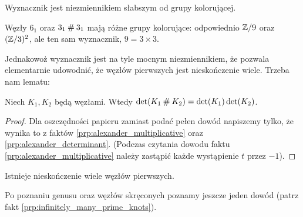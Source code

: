 Wyznacznik jest niezmiennikiem słabszym  od grupy kolorującej.

\begin{example}
    Węzły $6_1$ oraz $3_1 \mathbin{\#} 3_1$ mają różne grupy kolorujące: odpowiednio $\mathbb Z/9$ oraz ~$(\mathbb Z/3)^2$, ale ten sam wyznacznik, $9 = 3 \times 3$.
\end{example}

Jednakowoż wyznacznik jest na tyle mocnym niezmiennikiem, że pozwala elementarnie udowodnić, że węzłów pierwszych jest nieskończenie wiele.
Trzeba nam lematu:

\begin{lemma}
\label{lem:det_multiplicativ}%
    Niech $K_1, K_2$ będą węzłami.
    Wtedy $\det(K_1 \mathbin{\#} K_2) = \det(K_1) \det(K_2)$.
\end{lemma}

\begin{proof}
    Dla oszczędności papieru zamiast podać pełen dowód napiszemy tylko, że wynika to z faktów \ref{prp:alexander_multiplicative} oraz \ref{prp:alexander_determinant}.
    (Podczas czytania dowodu faktu \ref{prp:alexander_multiplicative} należy zastąpić każde wystąpienie $t$ przez $-1$).
\end{proof}

\begin{proposition}
\label{prop:infinite_prime_knots_1}%
    Istnieje nieskończenie wiele węzłów pierwszych.
\end{proposition}

Po poznaniu genusu oraz węzłów skręconych poznamy jeszcze jeden dowód (patrz fakt \ref{prp:infinitely_many_prime_knots}).

